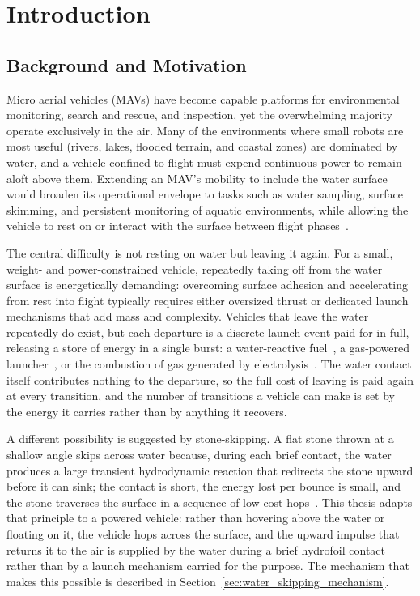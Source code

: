 \chapter{Introduction}
\label{chapter:introduction}

\section{Background and Motivation}
\label{sec:background_motivation}

Micro aerial vehicles (MAVs) have become capable platforms for environmental
monitoring, search and rescue, and inspection, yet the overwhelming majority
operate exclusively in the air.  Many of the environments where small robots
are most useful (rivers, lakes, flooded terrain, and coastal zones) are
dominated by water, and a vehicle confined to flight must expend continuous
power to remain aloft above them.  Extending an MAV's mobility to include the
water surface would broaden its operational envelope to tasks such as water
sampling, surface skimming, and persistent monitoring of aquatic environments,
while allowing the vehicle to rest on or interact with the surface between
flight phases~\cite{floreano2015science,siddall2014launching}.

The central difficulty is not resting on water but leaving it again.  For a
small, weight- and power-constrained vehicle, repeatedly taking off from the
water surface is energetically demanding: overcoming surface adhesion and
accelerating from rest into flight typically requires either oversized thrust
or dedicated launch mechanisms that add mass and complexity.  Vehicles that
leave the water repeatedly do exist, but each departure is a discrete launch
event paid for in full, releasing a store of energy in a single burst: a
water-reactive fuel~\cite{zufferey2019consecutive}, a gas-powered
launcher~\cite{siddall2014launching}, or the combustion of gas generated by
electrolysis~\cite{chen2017biologically}.  The water contact itself contributes
nothing to the departure, so the full cost of leaving is paid again at every
transition, and the number of transitions a vehicle can make is set by the
energy it carries rather than by anything it recovers.

A different possibility is suggested by stone-skipping.  A flat stone thrown
at a shallow angle skips across water because, during each brief contact, the
water produces a large transient hydrodynamic reaction that redirects the
stone upward before it can sink; the contact is short, the energy lost per
bounce is small, and the stone traverses the surface in a sequence of low-cost
hops~\cite{bocquet2003physics,clanet2004secrets}.
This thesis adapts that principle to a powered vehicle: rather than hovering
above the water or floating on it, the vehicle hops across the surface, and the
upward impulse that returns it to the air is supplied by the water during a
brief hydrofoil contact rather than by a launch mechanism carried for the
purpose.  The mechanism that makes this possible is described in
Section~\ref{sec:water_skipping_mechanism}.

